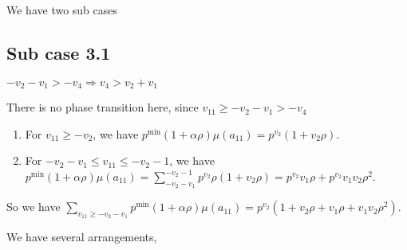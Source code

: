 \documentclass{article}
\begin{document}
We have two sub cases

\subsection{Sub case 3.1}
$-v_2-v_1>-v_4\Rightarrow{v_4>v_2+v_1}$

There is no phase transition here, since $v_{11}\geq{-v_2-v_1}>-v_4$
\begin{enumerate}
    \item 
For $v_{11}\geq{-v_2}$, we have $p^{\min}(1+\alpha\rho)\mu(a_{11})=p^{v_2}(1+v_2\rho)$.
\item 
For $-v_2-v_1\leq{v_{11}}\leq{-v_2-1}$, we have $p^{\min}(1+\alpha\rho)\mu(a_{11})=\sum_{-v_2-v_1}^{-v_2-1}p^{v_2}\rho(1+v_2\rho)=p^{v_2}v_1\rho+p^{v_2}v_1v_2\rho^2$.
\end{enumerate}
So we have $\sum_{v_{11}\geq{-v_2-v_1}}p^{\min}(1+\alpha\rho)\mu(a_{11})=p^{v_2}(1+v_2\rho+v_1\rho+v_1v_2\rho^2).$

We have several arrangements,
\end{document}
